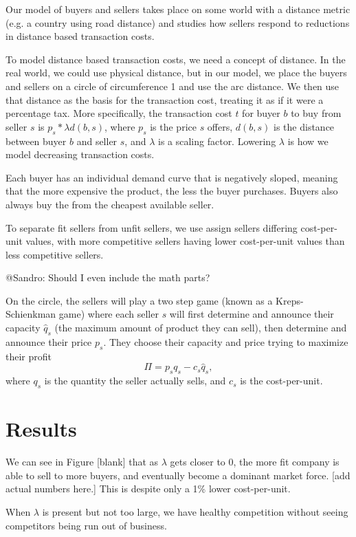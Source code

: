 \documentclass[final,5p,times,twocolumn,11pt]{elsarticle}
\numberwithin{equation}{section} %
\begin{document}
Our model of buyers and sellers takes place on some world with a distance
metric (e.g. a country using road distance) and studies how sellers respond to
reductions in distance based transaction costs.

To model distance based transaction costs, we need a concept of distance.  In
the real world, we could use physical distance, but in our model, we place the
buyers and sellers on a circle of circumference 1 and use the arc distance.
We then use that distance as the basis for the transaction cost, treating it as
if it were a percentage tax. More specifically, the transaction cost $t$ for
buyer $b$ to buy from seller $s$ is $p_s * \lambda d(b, s)$, where $p_s$ is the
price $s$ offers, $d(b, s)$ is the distance between buyer $b$ and seller $s$,
and $\lambda$ is a scaling factor. Lowering $\lambda$ is how we model
decreasing transaction costs.

Each buyer has an individual demand curve that is negatively sloped, meaning
that the more expensive the product, the less the buyer purchases. Buyers also
always buy the from the cheapest available seller.

To separate fit sellers from unfit sellers, we use assign sellers differing
cost-per-unit values, with more competitive sellers having lower cost-per-unit
values than less competitive sellers.

@Sandro: Should I even include the math parts?

On the circle, the sellers will play a two step game (known as a
Kreps-Schienkman game) where each seller $s$ will first determine and announce
their capacity $\hat q_s$ (the maximum amount of product they can sell), then
determine and announce their price $p_s$. They choose their capacity and price
trying to maximize their profit $$\Pi = p_sq_s - c_s\hat q_s,$$ where $q_s$ is
the quantity the seller actually sells, and $c_s$ is the cost-per-unit. 


\section{Results}
We can see in Figure [blank] that as $\lambda$ gets closer to 0, the more fit
company is able to sell to more buyers, and eventually become a dominant
market force. [add actual numbers here.] This is despite only a 1\% lower
cost-per-unit. 

When $\lambda$ is present but not too large, we have healthy competition
without seeing competitors being run out of business.
\end{document}
